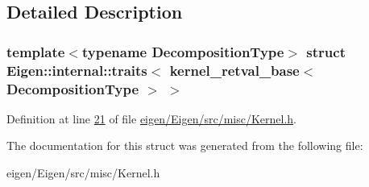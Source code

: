 \subsection{Detailed Description}
\subsubsection*{template$<$typename Decomposition\+Type$>$\newline
struct Eigen\+::internal\+::traits$<$ kernel\+\_\+retval\+\_\+base$<$ Decomposition\+Type $>$ $>$}



Definition at line \hyperlink{eigen_2_eigen_2src_2misc_2_kernel_8h_source_l00021}{21} of file \hyperlink{eigen_2_eigen_2src_2misc_2_kernel_8h_source}{eigen/\+Eigen/src/misc/\+Kernel.\+h}.



The documentation for this struct was generated from the following file\+:\begin{DoxyCompactItemize}
\item 
eigen/\+Eigen/src/misc/\+Kernel.\+h\end{DoxyCompactItemize}
